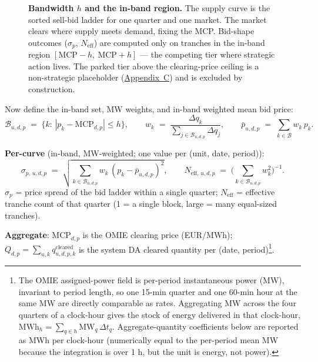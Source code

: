 \documentclass[11pt]{article}
\begin{document}
\begin{figure}[htbp]
\caption{\textbf{Bandwidth $h$ and the in-band region.} The supply curve
is the sorted sell-bid ladder for one quarter and one market. The market
clears where supply meets demand, fixing the MCP. Bid-shape outcomes
($\sigma_p$, $N_{\text{eff}}$) are computed only on tranches in the
in-band region $[\text{MCP}-h,\ \text{MCP}+h]$ --- the competing tier
where strategic action lives. The parked tier above the clearing-price
ceiling is a non-strategic placeholder (\hyperref[sec:context]{Appendix~C}) and
is excluded by construction.}
\label{fig:in-band-bandwidth}
\end{figure}

Now define the in-band set, MW weights, and in-band weighted mean bid price:
\[
\mathcal{B}_{u,d,p} \;=\; \{k:\,|p_k-\text{MCP}_{d,p}|\le h\}, \qquad w_k \;=\; \frac{\Delta q_k}{\sum_{j\in\mathcal{B}_{u,d,p}} \Delta q_j}, \qquad \bar p_{u,d,p} \;=\; \sum_{k\in\mathcal{B}} w_k\,p_k.
\]

\textbf{Per-curve} (in-band, MW-weighted; one value per (unit, date, period)):
\[
\sigma_{p,\,u,d,p} \;=\; \sqrt{\sum_{k\in\mathcal{B}_{u,d,p}} w_k\,(p_k-\bar p_{u,d,p})^2}, \qquad
N_{\text{eff},\,u,d,p} \;=\; \Big(\sum_{k\in\mathcal{B}_{u,d,p}} w_k^2\Big)^{-1}.
\]
$\sigma_p$ = price spread of the bid ladder within a single quarter; $N_{\text{eff}}$ = effective tranche count of that quarter (1 = a single block, large = many equal-sized tranches).
\vspace{10pt}


\textbf{Aggregate}: $\text{MCP}_{d,p}$ is the OMIE clearing price (EUR/MWh); $Q_{d,p}=\sum_{u,k} q^{\text{cleared}}_{u,d,p,k}$ is the system DA cleared quantity per (date, period)\footnote{The OMIE assigned-power field is per-period instantaneous power (MW), invariant to period length, so one 15-min quarter and one 60-min hour at the same MW are directly comparable as rates. Aggregating MW across the four quarters of a clock-hour gives the stock of energy delivered in that clock-hour, $\text{MWh}_h = \sum_{q\in h}\text{MW}_q\,\Delta t_q$. Aggregate-quantity coefficients below are reported as MWh per clock-hour (numerically equal to the per-period mean MW because the integration is over 1 h, but the unit is energy, not power).}.
\vspace{10pt}
\end{document}
